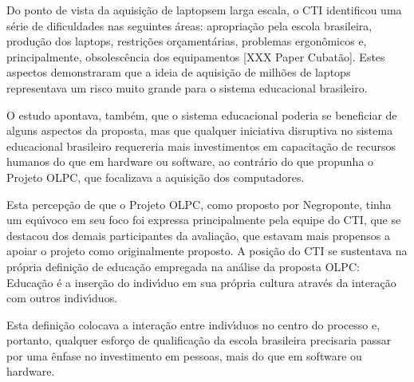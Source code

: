 \documentclass[
12pt,		%
openright,	%
twoside,  %
a4paper,			%
chapter=TITLE,		%
english,			%
french,				%
spanish,			%
brazil				%
]{USPSC-classe/USPSC_RedarTex}
\begin{document}
Do ponto de vista da aquisi\c{c}\~ao de \textquotedbl laptops\textquotedbl  em larga escala, o CTI identificou uma s\'erie de dificuldades nas seguintes \'areas: apropria\c{c}\~ao pela escola brasileira, produ\c{c}\~ao dos laptops, restri\c{c}\~oes or\c{c}ament\'arias, problemas ergon\^omicos e, principalmente, obsolesc\^encia dos equipamentos [XXX Paper Cubat\~ao]. Estes aspectos demonstraram que a ideia de aquisi\c{c}\~ao de milh\~oes de laptops representava um risco muito grande para o sistema educacional brasileiro.










O estudo apontava, tamb\'em, que o sistema educacional poderia se beneficiar de alguns aspectos da proposta, mas que qualquer iniciativa disruptiva no sistema educacional brasileiro requereria mais investimentos em capacita\c{c}\~ao de recursos humanos do que em hardware ou software, ao contr\'ario do que propunha o Projeto OLPC, que focalizava a aquisi\c{c}\~ao dos computadores.










Esta percep\c{c}\~ao de que o Projeto OLPC, como proposto por Negroponte, tinha um equ\'{\i}voco em seu foco foi expressa principalmente pela equipe do CTI, que se destacou dos demais participantes da avalia\c{c}\~ao, que estavam mais propensos a apoiar o projeto como originalmente proposto. A posi\c{c}\~ao do CTI se sustentava na pr\'opria defini\c{c}\~ao de educa\c{c}\~ao empregada na an\'alise da proposta OLPC: \textquotedbl Educa\c{c}\~ao \'e a inser\c{c}\~ao do indiv\'{\i}duo em sua pr\'opria cultura atrav\'es da intera\c{c}\~ao com outros indiv\'{\i}duos.










Esta defini\c{c}\~ao colocava a intera\c{c}\~ao entre indiv\'{\i}duos no centro do processo e, portanto, qualquer esfor\c{c}o de qualifica\c{c}\~ao da escola brasileira precisaria passar por uma \^enfase no investimento em \textquotedbl pessoas, mais do que em software ou hardware\textquotedbl .
\end{document}
